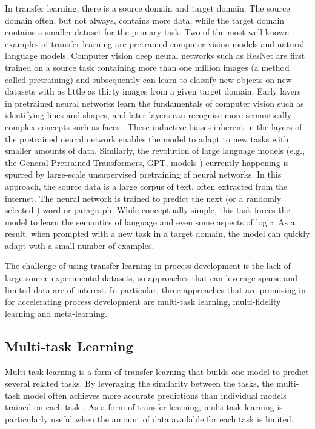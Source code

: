 In transfer learning, there is a source domain and target domain. The source domain often, but not always, contains more data, while the target domain contains a smaller dataset for the primary task. Two of the most well-known examples of transfer learning are pretrained computer vision models and natural language models. Computer vision deep neural networks such as ResNet \cite{He2016} are first trained on a source task containing more than one million images (a method called pretraining) \cite{Russakovsky2015} and subsequently can learn to classify new objects on new datasets with as little as thirty images from a given target domain. Early layers in pretrained neural networks learn the fundamentals of computer vision such as identifying lines and shapes, and later layers can recognise more semantically complex concepts such as faces \cite{Zeiler2014}. These inductive biases inherent in the layers of the pretrained neural network enables the model to adapt to new tasks with smaller amounts of data.  Similarly, the revolution of large language models (e.g., the General Pretrained Transformers, GPT, models \cite{Radford2018, Brown2020}) currently happening is spurred by large-scale unsupervised pretraining of neural networks. In this approach, the source data is a large corpus of text, often extracted from the internet. The neural network is trained to predict the next (or a randomly selected \cite{Delvin2019}) word or paragraph. While conceptually simple, this task forces the model to learn the semantics of language and even some aspects of logic. As a result, when prompted with a new task in a target domain, the model can quickly adapt with a small number of examples.

The challenge of using transfer learning in process development is the lack of large source experimental datasets, so approaches that can leverage sparse and limited data are of interest. In particular, three approaches that are promising in for accelerating process development are multi-task learning, multi-fidelity learning and meta-learning.

\subsection{Multi-task Learning}

Multi-task learning is a form of transfer learning that builds one model to predict several related tasks. By leveraging the similarity between the tasks, the multi-task model often achieves more accurate predictions than individual models trained on each task \cite{Simes2018}. As a form of transfer learning, multi-task learning is particularly useful when the amount of data available for each task is limited.

